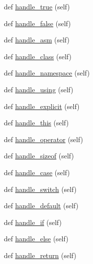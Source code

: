 \begin{DoxyCompactItemize}
\item 
def \mbox{\hyperlink{classcpp_1_1ast_1_1_ast_builder_ad480255644817388b81b05acc4aa9c9a}{handle\+\_\+true}} (self)
\item 
def \mbox{\hyperlink{classcpp_1_1ast_1_1_ast_builder_afe125e384026baf74b55593b254fc10c}{handle\+\_\+false}} (self)
\item 
def \mbox{\hyperlink{classcpp_1_1ast_1_1_ast_builder_acf6ec42d567cd85a9bad77772c381a4e}{handle\+\_\+asm}} (self)
\item 
def \mbox{\hyperlink{classcpp_1_1ast_1_1_ast_builder_a93bd39632593bec36972355b7e1893e0}{handle\+\_\+class}} (self)
\item 
def \mbox{\hyperlink{classcpp_1_1ast_1_1_ast_builder_ae6dde01c5f9ac7ba3b14dff01cac66e4}{handle\+\_\+namespace}} (self)
\item 
def \mbox{\hyperlink{classcpp_1_1ast_1_1_ast_builder_a785563f31bc3ed9559d9ce2854a83f1b}{handle\+\_\+using}} (self)
\item 
def \mbox{\hyperlink{classcpp_1_1ast_1_1_ast_builder_a568860050542b53d3df9cf479f2a5e1c}{handle\+\_\+explicit}} (self)
\item 
def \mbox{\hyperlink{classcpp_1_1ast_1_1_ast_builder_ad96a39776b5439fa9a5c2989f8da20cd}{handle\+\_\+this}} (self)
\item 
def \mbox{\hyperlink{classcpp_1_1ast_1_1_ast_builder_a7ca1318675b9eff41cb4a838d63eb6e6}{handle\+\_\+operator}} (self)
\item 
def \mbox{\hyperlink{classcpp_1_1ast_1_1_ast_builder_acfd733ff9115e3292bea10e160bb6184}{handle\+\_\+sizeof}} (self)
\item 
def \mbox{\hyperlink{classcpp_1_1ast_1_1_ast_builder_ac4f02e1ba7df670086e4c9dabdb21458}{handle\+\_\+case}} (self)
\item 
def \mbox{\hyperlink{classcpp_1_1ast_1_1_ast_builder_a1dffcdf7154158461a652c5b885bfa19}{handle\+\_\+switch}} (self)
\item 
def \mbox{\hyperlink{classcpp_1_1ast_1_1_ast_builder_a6bf895d948d231ffcd058df7af05d0be}{handle\+\_\+default}} (self)
\item 
def \mbox{\hyperlink{classcpp_1_1ast_1_1_ast_builder_a39f2561dfcf36485b2050dff258ece2b}{handle\+\_\+if}} (self)
\item 
def \mbox{\hyperlink{classcpp_1_1ast_1_1_ast_builder_aeb676b03467a93454be018ac243f89a2}{handle\+\_\+else}} (self)
\item 
def \mbox{\hyperlink{classcpp_1_1ast_1_1_ast_builder_a8330d1f34d40b0e82495ec794575289d}{handle\+\_\+return}} (self)
\item 

\end{DoxyCompactItemize}
